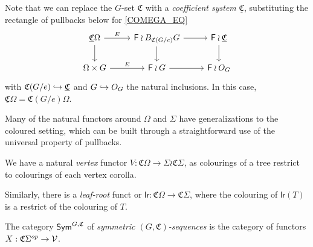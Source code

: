 \documentclass[psamsfonts,onesided,10pt
,draft
]{amsart}%
\begin{document}
\begin{remark}
      Note that we can replace the $G$-set $\mathfrak C$ with a \textit{coefficient system} $\underline{\mathfrak C}$,
      substituting the rectangle of pullbacks below for \eqref{COMEGA_EQ}
      \begin{equation}
            \begin{tikzcd}
                  \underline{\mathfrak C}\Omega \arrow[d] \arrow[r, "E"]
                  &
                  \mathsf F \wr B_{\mathfrak C(G/e)}G \arrow[r] \arrow[d]
                  &
                  \mathsf F \wr \underline{\mathfrak C} \arrow[d]
                  \\
                  \Omega \times G \arrow[r, "E"]
                  &
                  \mathsf F \wr G \arrow[r]
                  &
                  \mathsf F \wr O_G
            \end{tikzcd}
      \end{equation}
      with $\mathfrak C(G/e) \hookrightarrow \underline{\mathfrak C}$ and $G \hookrightarrow O_G$ the natural inclusions.
      In this case, $\underline{\mathfrak C}\Omega = \mathfrak C(G/e)\Omega$.
\end{remark}

Many of the natural functors around $\Omega$ and $\Sigma$ have generalizations to the coloured setting,
which can be built through a straightforward use of the universal property of pullbacks.

\begin{definition}
      We have a natural \textit{vertex} functor
      $V: \mathfrak C \Omega \to \Sigma \wr \mathfrak C \Sigma$,
      as colourings of a tree restrict to colourings of each vertex corolla.

      Similarly, there is a \textit{leaf-root} funct or
      $\mathsf{lr}: \mathfrak C \Omega \to \mathfrak C \Sigma$,
      where the colouring of $\mathsf{lr}(T)$ is a restrict of the colouring of $T$.
\end{definition}

\begin{definition}
      The category $\mathsf{Sym}^{G,\mathfrak C}$ of \textit{symmetric $(G,\mathfrak C)$-sequences} is
      the category of functors $X: \mathfrak C \Sigma^{op} \to \mathcal V$.
\end{definition}
\end{document}
